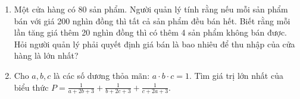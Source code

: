 \begin{ex}
{\begin{center}
		
	\end{center}
	}
\end{ex}

\begin{ex} %
	\begin{enumerate}
		\item[a)] Một cửa hàng có 80 sản phẩm. Người quản lý tính rằng nếu mỗi sản phẩm bán với giá 200 nghìn đồng thì tất cả sản phẩm đều bán hết. Biết rằng mỗi lần tăng giá thêm 20 nghìn đồng thì có thêm 4 sản phẩm không bán được. Hỏi người quản lý phải quyết định giá bán là bao nhiêu để thu nhập của cửa hàng là lớn nhất?
		\item[b)] Cho $a, b, c$ là các số dương thỏa mãn: $a \cdot b \cdot c = 1$.
		Tìm giá trị lớn nhất của biểu thức $P = \frac{1}{a+2b+3} + \frac{1}{b+2c+3} + \frac{1}{c+2a+3}$.
	\end{enumerate}
\end{ex}

